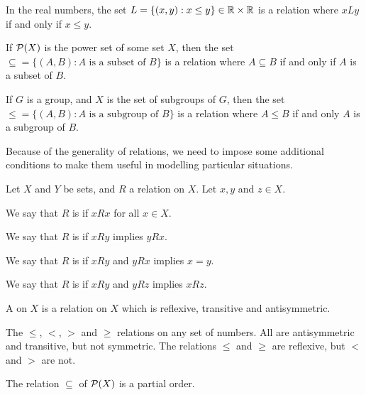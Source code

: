 \begin{example}
  In the real numbers, the set $L = \{ (x,y) : x \le y\} \in \mathbb{R} \times \mathbb{R}$
  is a relation where $xLy$ if and only if $x \le y$.
\end{example}

\begin{example}
  If $\mathcal{P}(X)$ is the power set of some set $X$, then the set
  $\subseteq = \{(A,B): \text{$A$ is a subset of $B$}\}$ is a relation
  where $A \subseteq B$ if and only if $A$ is a subset of $B$.
\end{example}

\begin{example}
  If $G$ is a group, and $X$ is the set of subgroups of $G$, then the set
  $\le = \{(A,B): \text{$A$ is a subgroup of $B$}\}$ is a relation where
  $A \le B$ if and only $A$ is a subgroup of $B$.
\end{example}

Because of the generality of relations, we need to impose some additional
conditions to make them useful in modelling particular situations.

\begin{definition}
  Let $X$ and $Y$ be sets, and $R$ a relation on $X$.  Let $x, y$ and $z \in X$.
  
  We say that $R$ is  if $xRx$ for all
  $x \in X$.
  
  We say that $R$ is  if $xRy$ implies
  $yRx$.
  
  We say that $R$ is  if $xRy$ and
  $yRx$ implies $x = y$.
  
  We say that $R$ is  if $xRy$ and
  $yRz$ implies $xRz$.
  
  A  on $X$ is a relation on $X$ which is
  reflexive, transitive and antisymmetric.
\end{definition}

\begin{example}
  The $\le$, $<$, $>$ and $\ge$ relations on any set of numbers. All are
  antisymmetric and transitive, but not symmetric.  The relations $\le$
  and $\ge$ are reflexive, but $<$ and $>$ are not.
\end{example}

\begin{example}
  The relation $\subseteq$ of $\mathcal{P}(X)$ is a partial order.
\end{example}

